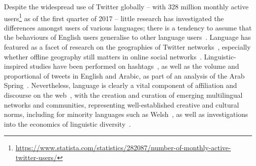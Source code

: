 \documentclass{llncs}
\begin{document}
%


Despite the widespread use of Twitter globally -- with 328 million
monthly active
users\footnote{\url{https://www.statista.com/statistics/282087/number-of-monthly-active-twitter-users/}}
as of the first quarter of 2017 -- little research has investigated
the differences amongst users of various languages; there is a
tendency to assume that the behaviours of English users generalise to
other language users~\cite{hong-et-al:2011}. Language has featured as
a facet of research on the geographies of Twitter
networks~\cite{takhteyev-et-al:2012}, especially whether offline
geography still matters in online social
networks~\cite{kulshrestha-et-al:2012}. Linguistic-inspired studies
have been performed on hashtags~\cite{cunha-et-al:2011}, as well as
the volume and proportional of tweets in English and Arabic, as part
of an analysis of the Arab
Spring~\cite{bruns-et-al:2013}. Nevertheless, language is clearly a
vital component of affiliation and discourse on the
web~\cite{zappavigna+martin:2012}, with the creation and curation of
emerging multilingual networks and communities, representing
well-established creative and cultural norms, including for minority
languages such as Welsh~\cite{gj+uj:2013}, as well as investigations
into the economics of linguistic
diversity~\cite{ginsburgh+weber:2011}.
\end{document}
